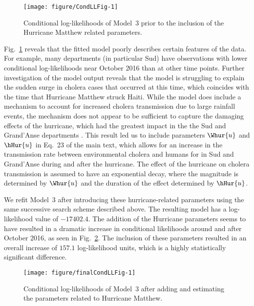 \begin{figure}[!ht]
\begin{knitrout}
\color{fgcolor}

{\centering \texttt{[image: figure/CondLLFig-1]} 

}


\end{knitrout}
\caption{\label{fig:condLL}Conditional log-likelihoods of Model~3 prior to the inclusion of the Hurricane Matthew related parameters.}
\end{figure}

Fig.~\ref{fig:condLL} reveals that the fitted model poorly describes certain features of the data.
For example, many departments (in particular Sud) have observations with lower conditional log-likelihoods near October 2016 than at other time points.
Further investigation of the model output reveals that the model is struggling to explain the sudden surge in cholera cases that occurred at this time, which coincides with the time that Hurricane Matthew struck Haiti.
While the model does include a mechanism to account for increased cholera transmission due to large rainfall events, the mechanism does not appear to be sufficient to capture the damaging effects of the hurricane, which had the greatest impact in the the Sud and Grand'Anse departments \citep{ferreirai16}.
This result led us to include parameters $\Whur{u}$ and $\hHur{u}$ in Eq.~23 of the main text, which allows for an increase in the transmission rate between environmental cholera and humans for in Sud and Grand'Anse during and after the hurricane.
The effect of the hurricane on cholera transmission is assumed to have an exponential decay, where the magnitude is determined by $\Whur{u}$ and the duration of the effect determined by $\hHur{u}$.



We refit Model~3 after introducing these hurricane-related parameters using the same successive search scheme described above.
The resulting model has a log-likelihood value of $-17402.4$.
The addition of the Hurricane parameters seems to have resulted in a dramatic increase in conditional likelihoods around and after October 2016, as seen in Fig.~\ref{fig:finalCondLL}.
The inclusion of these parameters resulted in an overall increase of $157.1$ log-likelihood units, which is a highly statistically significant difference.



\begin{figure}[!ht]
\begin{knitrout}
\color{fgcolor}

{\centering \texttt{[image: figure/finalCondLLFig-1]} 

}


\end{knitrout}
\caption{\label{fig:finalCondLL}Conditional log-likelihoods of Model~3 after adding and estimating the parameters related to Hurricane Matthew.}
\end{figure}

